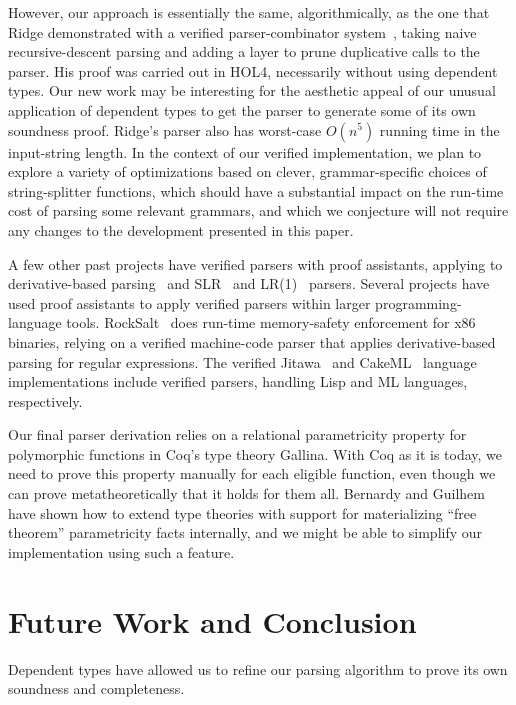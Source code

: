 \documentclass[preprint]{sigplanconf}
\begin{document}
  However, our approach is essentially the same, algorithmically, as the one that Ridge demonstrated with a verified parser-combinator system~\cite{Ridge}, taking naive recursive-descent parsing and adding a layer to prune duplicative calls to the parser.  His proof was carried out in HOL4, necessarily without using dependent types.  Our new work may be interesting for the aesthetic appeal of our unusual application of dependent types to get the parser to generate some of its own soundness proof.  Ridge's parser also has worst-case $O(n^5)$ running time in the input-string length.  In the context of our verified implementation, we plan to explore a variety of optimizations based on clever, grammar-specific choices of string-splitter functions, which should have a substantial impact on the run-time cost of parsing some relevant grammars, and which we conjecture will not require any changes to the development presented in this paper.

  A few other past projects have verified parsers with proof assistants, applying to derivative-based parsing~\cite{DerivsCoq} and SLR~\cite{SLR} and LR(1)~\cite{LR1} parsers.  Several projects have used proof assistants to apply verified parsers within larger programming-language tools.  RockSalt~\cite{RockSalt} does run-time memory-safety enforcement for x86 binaries, relying on a verified machine-code parser that applies derivative-based parsing for regular expressions.  The verified Jitawa~\cite{Jitawa} and CakeML~\cite{CakeML} language implementations include verified parsers, handling Lisp and ML languages, respectively.

  Our final parser derivation relies on a relational parametricity property for polymorphic functions in Coq's type theory Gallina.  With Coq as it is today, we need to prove this property manually for each eligible function, even though we can prove metatheoretically that it holds for them all.  Bernardy and Guilhem~\cite{InColor} have shown how to extend type theories with support for materializing ``free theorem'' parametricity facts internally, and we might be able to simplify our implementation using such a feature.


\section{Future Work and Conclusion} \label{sec:conclusion}
  Dependent types have allowed us to refine our parsing algorithm to prove its own soundness and completeness.
\end{document}

